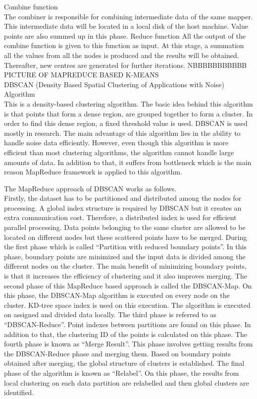 \documentclass[conference]{IEEEtran}
\begin{document}
Combine function\\
The combiner is responsible for combining intermediate data of the same mapper. This intermediate data will be located in a local disk of the host machine. Value points are also summed up in this phase.
Reduce function
All the output of the combine function is given to this function as input. At this stage, a summation all the values from all the nodes is produced and the results will be obtained. Thereafter, new centres are generated for further iterations.
NBBBBBBBBBBB PICTURE OF MAPREDUCE BASED K-MEANS \\

DBSCAN (Density Based Spatial Clustering of Applications with Noise) Algorithm\\

This is a density-based clustering algorithm. The basic idea behind this algorithm is that points that form a dense region, are grouped together to form a cluster. In order to find this dense region, a fixed threshold value is used. DBSCAN is used mostly in research. The main advantage of this algorithm lies in the ability to handle noise data efficiently. However, even though this algorithm is more efficient than most clustering algorithms, the algorithm cannot handle large amounts of data. In addition to that, it suffers from bottleneck which is the main reason MapReduce framework is applied to this algorithm. 

The MapReduce approach of DBSCAN works as follows. \\

Firstly, the dataset has to be partitioned and distributed among the nodes for processing. A global index structure is required by DBSCAN but it creates an extra communication cost. Therefore, a distributed index is used for efficient parallel processing. Data points belonging to the same cluster are allowed to be located on different nodes but these scattered points have to be merged. During the first phase which is called “Partition with reduced boundary points”. In this phase, boundary points are minimized and the input data is divided among the different nodes on the cluster. The main benefit of minimizing boundary points, is that it increases the efficiency of clustering and it also improves merging. The second phase of this MapReduce based approach is called the DBSCAN-Map. On this phase, the DBSCAN-Map algorithm is executed on every node on the cluster. KD-tree space index is used on this execution. The algorithm is executed on assigned and divided data locally. The third phase is referred to as “DBSCAN-Reduce”. Point indexes between partitions are found on this phase. In addition to that, the clustering ID of the points is calculated on this phase. The fourth phase is known as “Merge Result”. This phase involves getting results from the DBSCAN-Reduce phase and merging them. Based on boundary points obtained after merging, the global structure of clusters is established. The final phase of the algorithm is known as “Relabel”. On this phase, the results from local clustering on each data partition are relabelled and then global clusters are identified.\\
\end{document}
